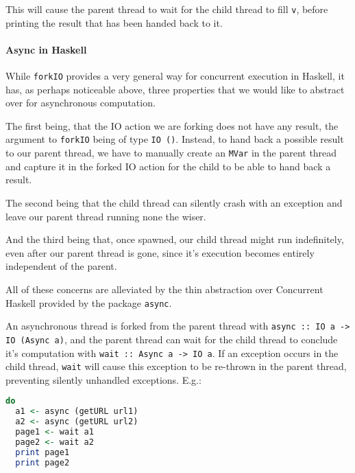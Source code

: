\documentclass[a4paper,UKenglish,cleveref, autoref, thm-restate]{lipics-v2021}
\begin{document}
This will cause the parent thread to wait for the child thread to fill \lstinline{v}, before printing the result that has been handed back to it.

\paragraph*{Async in Haskell}

While \lstinline{forkIO} provides a very general way for concurrent execution in Haskell, it has, as perhaps noticeable above, three properties that we would like to abstract over for asynchronous computation.

The first being, that the IO action we are forking does not have any result, the argument to \lstinline{forkIO} being of type \lstinline{IO ()}. Instead, to hand back a possible result to our parent thread, we have to manually create an \lstinline{MVar} in the parent thread and capture it in the forked IO action for the child to be able to hand back a result. 

The second being that the child thread can silently crash with an exception and leave our parent thread running none the wiser\cite{ControlC47:online}.

And the third being that, once spawned, our child thread might run indefinitely, even after our parent thread is gone, since it's execution becomes entirely independent of the parent\cite{ControlC47:online}.

All of these concerns are alleviated by the thin abstraction over Concurrent Haskell provided by the package \lstinline{async}.

An asynchronous thread is forked from the parent thread with \newline\lstinline{async :: IO a -> IO (Async a)}, and the parent thread can wait for the child thread to conclude it's computation with \lstinline{wait :: Async a -> IO a}\cite{ControlC47:online}. If an exception occurs in the child thread, \lstinline{wait} will cause this exception to be re-thrown in the parent thread, preventing silently unhandled exceptions. E.g.:

\begin{minipage}{\linewidth}
\begin{lstlisting}[language=Haskell,caption={Fetching two pages asynchronously and waiting for both results},captionpos=t]
do
  a1 <- async (getURL url1)
  a2 <- async (getURL url2)
  page1 <- wait a1
  page2 <- wait a2
  print page1
  print page2
\end{lstlisting}
\end{minipage}
\end{document}
